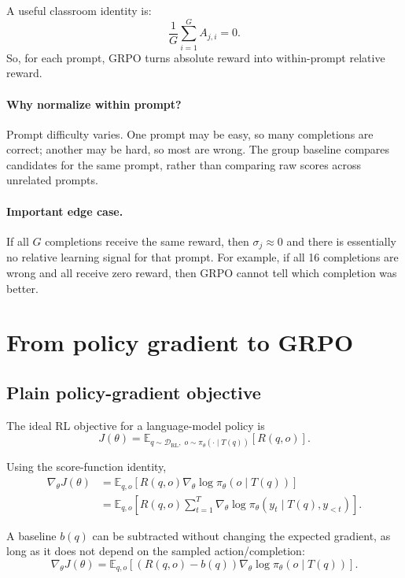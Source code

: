 \documentclass[11pt]{article}
\newcommand{\D}{\mathcal{D}}
\newcommand{\E}{\mathbb{E}}
\newcommand{\RL}{\mathrm{RL}}
\begin{document}
A useful classroom identity is:
\begin{equation}
\frac{1}{G}\sum_{i=1}^{G}A_{j,i}=0.
\end{equation}
So, for each prompt, GRPO turns absolute reward into within-prompt relative reward.

\paragraph{Why normalize within prompt?}
Prompt difficulty varies. One prompt may be easy, so many completions are correct; another may be hard, so most are wrong. The group baseline compares candidates for the same prompt, rather than comparing raw scores across unrelated prompts.

\paragraph{Important edge case.}
If all $G$ completions receive the same reward, then $\sigma_j\approx 0$ and there is essentially no relative learning signal for that prompt. For example, if all 16 completions are wrong and all receive zero reward, then GRPO cannot tell which completion was better.

\section{From policy gradient to GRPO}

\subsection{Plain policy-gradient objective}

The ideal RL objective for a language-model policy is
\begin{equation}
J(\theta)=\E_{q\sim \D_{\RL},\;o\sim \pi_\theta(\cdot\mid T(q))}
\left[R(q,o)\right].
\end{equation}

Using the score-function identity,
\begin{align}
\nabla_\theta J(\theta)
&=\E_{q,o}\left[R(q,o)\nabla_\theta\log \pi_\theta(o\mid T(q))\right] \\
&=\E_{q,o}\left[R(q,o)\sum_{t=1}^{T}\nabla_\theta\log \pi_\theta(y_t\mid T(q),y_{<t})\right].
\end{align}

A baseline $b(q)$ can be subtracted without changing the expected gradient, as long as it does not depend on the sampled action/completion:
\begin{equation}
\nabla_\theta J(\theta)
=\E_{q,o}\left[(R(q,o)-b(q))\nabla_\theta\log\pi_\theta(o\mid T(q))\right].
\end{equation}
\end{document}
